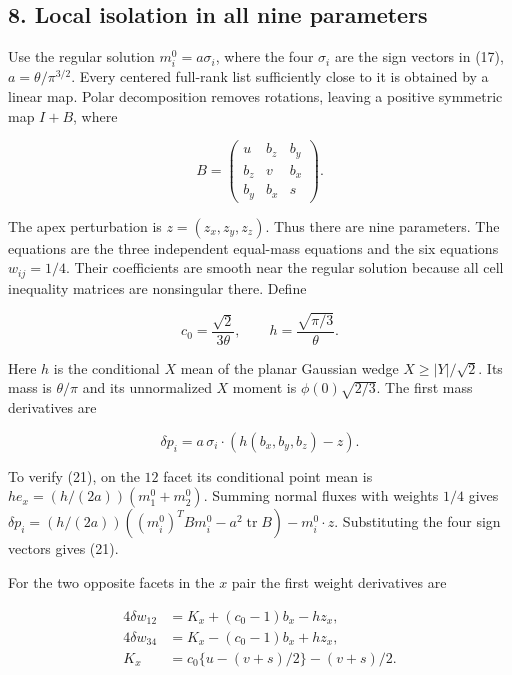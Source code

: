 \documentclass[
  11pt,
]{article}
\begin{document}
\subsection{8. Local isolation in all nine
parameters}\label{local-isolation-in-all-nine-parameters}

Use the regular solution \(m_i^0=a\sigma_i\), where the four
\(\sigma_i\) are the sign vectors in (17), \(a=\theta/\pi^{3/2}\). Every
centered full-rank list sufficiently close to it is obtained by a linear
map. Polar decomposition removes rotations, leaving a positive symmetric
map \(I+B\), where

\[
 B=\begin{pmatrix}u&b_z&b_y\\b_z&v&b_x\\b_y&b_x&s\end{pmatrix}.
\]

The apex perturbation is \(z=(z_x,z_y,z_z)\). Thus there are nine
parameters. The equations are the three independent equal-mass equations
and the six equations \(w_{ij}=1/4\). Their coefficients are smooth near
the regular solution because all cell inequality matrices are
nonsingular there. Define

\[
 c_0=\frac{\sqrt2}{3\theta},\qquad
 h=\frac{\sqrt{\pi/3}}{\theta}.                          \tag{20}
\]

Here \(h\) is the conditional \(X\) mean of the planar Gaussian wedge
\(X\ge|Y|/\sqrt2\). Its mass is \(\theta/\pi\) and its unnormalized
\(X\) moment is \(\phi(0)\sqrt{2/3}\). The first mass derivatives are

\[
 \delta p_i=a\,\sigma_i\cdot(h(b_x,b_y,b_z)-z).            \tag{21}
\]

To verify (21), on the \(12\) facet its conditional point mean is
\(h e_x=(h/(2a))(m_1^0+m_2^0)\). Summing normal fluxes with weights
\(1/4\) gives
\(\delta p_i=(h/(2a))( (m_i^0)^TBm_i^0-a^2\operatorname{tr}B)
-m_i^0\cdot z\). Substituting the four sign vectors gives (21).

For the two opposite facets in the \(x\) pair the first weight
derivatives are

\begin{equation*}
\begin{aligned}
 4\delta w_{12}&=K_x+(c_0-1)b_x-hz_x,\\
 4\delta w_{34}&=K_x-(c_0-1)b_x+hz_x,\\
 K_x&=c_0\{u-(v+s)/2\}-(v+s)/2.
 \end{aligned}                                         \tag{22}
\end{equation*}
\end{document}
